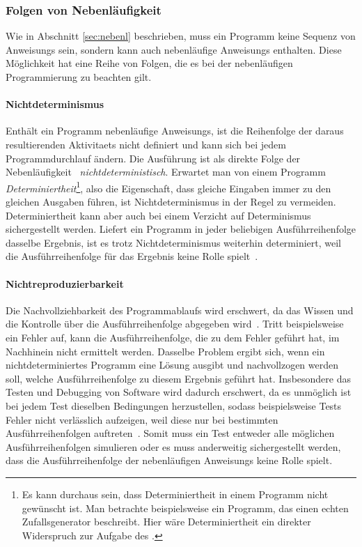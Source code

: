 \subsubsection{Folgen von Nebenläufigkeit}\label{sec:nebenl-folgen}
Wie in Abschnitt \ref{sec:nebenl} beschrieben, muss ein \gls{Programm} keine Sequenz von \glspl{Anweisung} sein, sondern kann auch nebenläufige \glspl{Anweisung} enthalten. Diese Möglichkeit hat eine Reihe von Folgen, die es bei der nebenläufigen Programmierung zu beachten gilt.
\paragraph{Nichtdeterminismus}
Enthält ein \gls{Programm} nebenläufige \glspl{Anweisung}, ist die Reihenfolge der daraus resultierenden \glspl{Aktivitaet} nicht definiert und kann sich bei jedem Programmdurchlauf ändern. Die Ausführung ist als direkte Folge der Nebenläufigkeit~\cite[S.~17~\psq]{Herrtwich1989} \emph{nichtdeterministisch}. Erwartet man von einem \gls{Programm} \emph{Determiniertheit}\footnote{Es kann durchaus sein, dass Determiniertheit in einem \gls{Programm} nicht gewünscht ist. Man betrachte beispielsweise ein \gls{Programm}, das einen echten Zufallsgenerator beschreibt. Hier wäre Determiniertheit ein direkter Widerspruch zur Aufgabe des .}, also die Eigenschaft, dass gleiche Eingaben immer zu den gleichen Ausgaben führen, ist Nichtdeterminismus in der Regel zu vermeiden. Determiniertheit kann aber auch bei einem Verzicht auf Determinismus sichergestellt werden. Liefert ein \gls{Programm} in jeder beliebigen Ausführreihenfolge dasselbe Ergebnis, ist es trotz Nichtdeterminismus weiterhin determiniert, weil die Ausführreihenfolge für das Ergebnis keine Rolle spielt~\cite[S.~18~\psq]{Herrtwich1989}. 
\paragraph{Nichtreproduzierbarkeit}
Die Nachvollziehbarkeit des Programmablaufs wird erschwert, da das Wissen und die Kontrolle über die Ausführreihenfolge abgegeben wird~\cite[S.~20]{Herrtwich1989}. Tritt beispielsweise ein Fehler auf, kann die Ausführreihenfolge, die zu dem Fehler geführt hat, im Nachhinein nicht ermittelt werden. Dasselbe Problem ergibt sich, wenn ein nichtdeterminiertes \gls{Programm} eine Lösung ausgibt und nachvollzogen werden soll, welche Ausführreihenfolge zu diesem Ergebnis geführt hat. Insbesondere das Testen und Debugging von Software wird dadurch erschwert, da es unmöglich ist bei jedem Test dieselben Bedingungen herzustellen, sodass beispielsweise Tests Fehler nicht verlässlich aufzeigen, weil diese nur bei bestimmten Ausführreihenfolgen auftreten~\cite[S.~20]{Herrtwich1989}. Somit muss ein Test entweder alle möglichen Ausführreihenfolgen simulieren oder es muss anderweitig sichergestellt werden, dass die Ausführreihenfolge der nebenläufigen \glspl{Anweisung} keine Rolle spielt.
